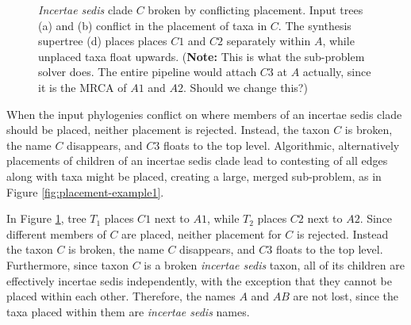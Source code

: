 \documentclass[english]{article}
\begin{document}
\begin{figure}
{}\hfill{}\hfill{}

\caption{\label{fig:Broken-incertae-sedis} \emph{Incertae sedis} clade $C$
broken by conflicting placement. Input trees (a) and (b) conflict
in the placement of taxa in $C$. The synthesis supertree (d) places
places $C1$ and $C2$ separately within $A$, while unplaced taxa
float upwards. (\textbf{Note:} This is what the sub-problem solver
does. The entire pipeline would attach $C3$ at $A$ actually, since
it is the MRCA of $A1$ and $A2$. Should we change this?) }

\end{figure}

When the input phylogenies conflict on where members of an incertae
sedis clade should be placed, neither placement is rejected. Instead,
the taxon $C$ is broken, the name $C$ disappears, and $C3$ floats to
the top level. Algorithmic, alternatively placements of children of an
incertae sedis clade lead to contesting of all edges along with taxa
might be placed, creating a large, merged sub-problem, as in Figure
\ref{fig:placement-example1}.

In Figure \ref{fig:Broken-incertae-sedis}, tree $T_{1}$ places $C1$
next to $A1$, while $T_{2}$ places $C2$ next to $A2$. Since different
members of $C$ are placed, neither placement for $C$ is rejected.
Instead the taxon $C$ is broken, the name $C$ disappears, and $C3$
floats to the top level. Furthermore, since taxon $C$ is a broken
\emph{incertae sedis }taxon, all of its children are effectively
incertae sedis independently, with the exception that they cannot be
placed within each other. Therefore, the names $A$ and $AB$ are not
lost, since the taxa placed within them are \emph{incertae sedis}
names.
\end{document}
